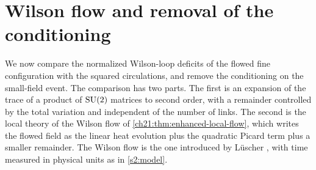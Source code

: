 \section{Wilson flow and removal of the conditioning}\label{ch29:sec:flow}

We now compare the normalized Wilson-loop deficits of the flowed fine configuration with the squared circulations, and remove the conditioning on the small-field event. The comparison has two parts. The first is an expansion of the trace of a product of $\mathrm{SU}(2)$ matrices to second order, with a remainder controlled by the total variation and independent of the number of links. The second is the local theory of the Wilson flow of \cref{ch21:thm:enhanced-local-flow}, which writes the flowed field as the linear heat evolution plus the quadratic Picard term plus a smaller remainder. The Wilson flow is the one introduced by Lüscher \cite{Luscher2010WilsonFlow}, with time measured in physical units as in \cref{s2:model}.

